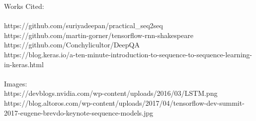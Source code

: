 \documentclass[titlepage]{article}
\begin{document}
\newpage
\large{Works Cited:}\\
\small{
\\https://github.com/suriyadeepan/practical\_seq2seq
\\https://github.com/martin-gorner/tensorflow-rnn-shakespeare 
\\https://github.com/Conchylicultor/DeepQA
\\https://blog.keras.io/a-ten-minute-introduction-to-sequence-to-sequence-learning-in-keras.html
}
~\\~\\
\large{Images:}
\small{
\\https://devblogs.nvidia.com/wp-content/uploads/2016/03/LSTM.png
\\https://blog.altoros.com/wp-content/uploads/2017/04/tensorflow-dev-summit-2017-eugene-brevdo-keynote-sequence-models.jpg
}\\
\nocite{*}


\end{document}
